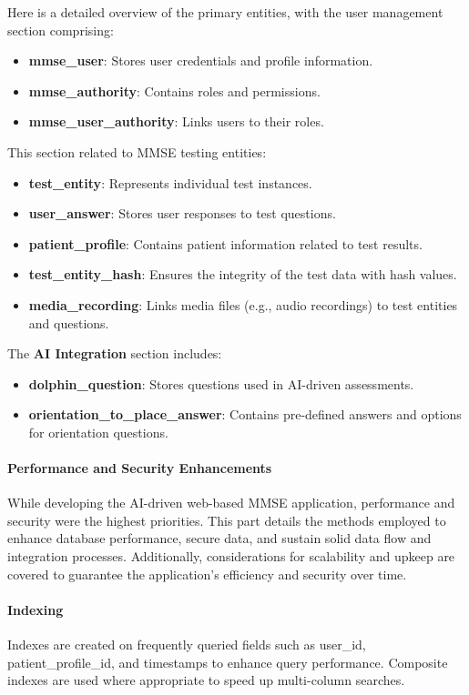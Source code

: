 Here is a detailed overview of the primary entities, with the user management section comprising:
\begin{itemize}
    \item \textbf{mmse\_user}: Stores user credentials and profile information.
    \item \textbf{mmse\_authority}: Contains roles and permissions.
    \item \textbf{mmse\_user\_authority}: Links users to their roles.
\end{itemize}

This section related to MMSE testing entities:
\begin{itemize}
    \item \textbf{test\_entity}: Represents individual test instances.
    \item \textbf{user\_answer}: Stores user responses to test questions.
    \item \textbf{patient\_profile}: Contains patient information related to test results.
    \item \textbf{test\_entity\_hash}: Ensures the integrity of the test data with hash values.
    \item \textbf{media\_recording}: Links media files (e.g., audio recordings) to test entities and questions.
\end{itemize}

The \textbf{AI Integration} section includes:
\begin{itemize}
    \item \textbf{dolphin\_question}: Stores questions used in AI-driven assessments.
    \item \textbf{orientation\_to\_place\_answer}: Contains pre-defined answers and options for orientation questions.
\end{itemize}

\paragraph{Performance and Security Enhancements}
While developing the AI-driven web-based MMSE application, performance and security were the highest priorities. This part details the methods employed to enhance database performance, secure data, and sustain solid data flow and integration processes. Additionally, considerations for scalability and upkeep are covered to guarantee the application's efficiency and security over time.

\paragraph{Indexing}
Indexes are created on frequently queried fields such as user\_id, patient\_profile\_id, and timestamps to enhance query performance. Composite indexes are used where appropriate to speed up multi-column searches.

